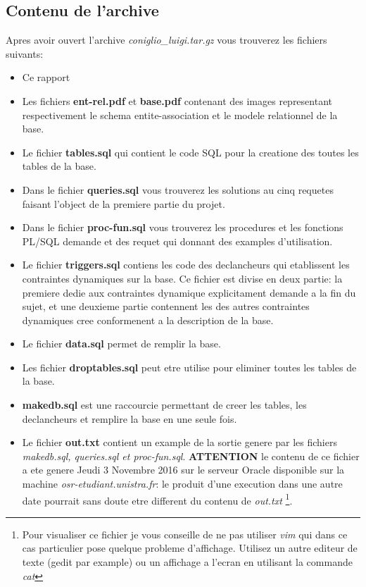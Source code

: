 \documentclass[twoside,openright,a4paper,11pt,french]{article}
\begin{document}
\subsection{Contenu de l'archive}
Apres avoir ouvert l'archive {\it coniglio\_luigi.tar.gz} vous
trouverez les fichiers suivants:
\smallbreak
\begin{itemize}
\item Ce rapport
\item Les fichiers {\bf ent-rel.pdf} et {\bf base.pdf} contenant
      des images representant respectivement le schema entite-association
      et le modele relationnel de la base.
\item Le fichier {\bf tables.sql} qui contient le code SQL pour la
      creatione des toutes les tables de la base.
\item Dans le fichier {\bf queries.sql} vous trouverez les solutions
      au cinq requetes faisant l'object de la premiere partie du projet.
\item Dans le fichier {\bf proc-fun.sql} vous trouverez les procedures
      et les fonctions PL/SQL demande et des requet qui donnant des 
      examples d'utilisation.
\item Le fichier {\bf triggers.sql} contiens les code des declancheurs qui
      etablissent les contraintes dynamiques sur la base.  Ce fichier est divise en
      deux partie: la premiere dedie aux contraintes dynamique explicitament
      demande a la fin du sujet, et une deuxieme partie contennent les
      des autres contraintes dynamiques cree conformenent a la description de la
      base.
\item Le fichier {\bf data.sql} permet de remplir la base.
\item Les fichier {\bf droptables.sql} peut etre utilise pour eliminer toutes 
      les tables de la base.
\item {\bf makedb.sql} est une raccourcie permettant de creer les tables, les
      declancheurs et remplire la base en une seule fois.
\item Le fichier {\bf out.txt} contient un example de la sortie genere par 
      les fichiers {\it makedb.sql, queries.sql et proc-fun.sql}. {\bf ATTENTION} le 
      contenu de ce fichier a ete genere Jeudi 3 Novembre 2016 sur le serveur Oracle
      disponible sur la machine {\it osr-etudiant.unistra.fr}: le produit
      d'une execution dans une autre date pourrait sans doute etre different du 
      contenu de {\it out.txt}
      \footnote{Pour visualiser ce fichier je vous conseille de ne pas utiliser
{\it vim} qui dans ce cas particulier pose quelque probleme d'affichage.
Utilisez un autre editeur de texte (gedit par example) ou un affichage a
l'ecran en utilisant la commande {\it cat}}.
\end{itemize}
\end{document}
